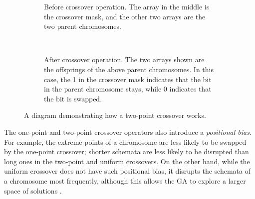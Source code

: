 \documentclass[12pt, twoside, a4paper]{report}
\begin{document}
\begin{figure}
\begin{subfigure}[b]{\textwidth}
\caption{Before crossover operation. The array in the middle is the crossover mask, and the other two arrays are the two parent chromosomes.}
\label{bg:ga:crossover_a}
\end{subfigure}\\[2em]

\begin{subfigure}[b]{\textwidth}
\centering
{}
\caption{After crossover operation. The two arrays shown are the offsprings of the above parent chromosomes. In this case, the 1 in the crossover mask indicates that the bit in the parent chromosome stays, while 0 indicates that the bit is swapped.}
\label{bg:ga:crossover_b}
\end{subfigure}
\caption{A diagram demonstrating how a two-point crossover works.}
\label{bg:ga:crossover}
\end{figure}


The one-point and two-point crossover operators also introduce a \textit{positional bias}. For example, the extreme points of a chromosome are less likely to be swapped by the one-point crossover; shorter schemata are less likely to be disrupted than long ones in the two-point and uniform crossovers. On the other hand, while the uniform crossover does not have such positional bias, it disrupts the schemata of a chromosome most frequently, although this allows the GA to explore a larger space of solutions \cite{RefWorks:224}.
\end{document}

